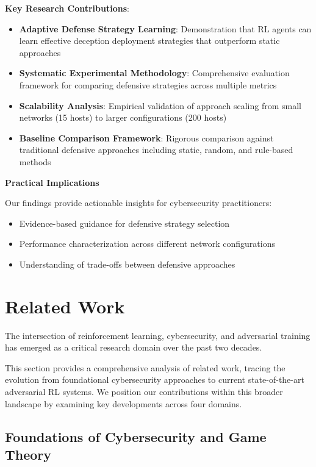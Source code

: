 \documentclass[12pt,twoside]{article}
\theoremstyle{definition}
\theoremstyle{plain}
\begin{document}
\textbf{Key Research Contributions}:
\begin{itemize}
    \item \textbf{Adaptive Defense Strategy Learning}: Demonstration that RL agents can learn effective deception deployment strategies that outperform static approaches
    \item \textbf{Systematic Experimental Methodology}: Comprehensive evaluation framework for comparing defensive strategies across multiple metrics
    \item \textbf{Scalability Analysis}: Empirical validation of approach scaling from small networks (15 hosts) to larger configurations (200 hosts)
    \item \textbf{Baseline Comparison Framework}: Rigorous comparison against traditional defensive approaches including static, random, and rule-based methods
\end{itemize}

\textbf{Practical Implications}

Our findings provide actionable insights for cybersecurity practitioners:
\begin{itemize}
    \item Evidence-based guidance for defensive strategy selection
    \item Performance characterization across different network configurations
    \item Understanding of trade-offs between defensive approaches
\end{itemize}

\section{Related Work}

The intersection of reinforcement learning, cybersecurity, and adversarial training has emerged as a critical research domain over the past two decades. 

This section provides a comprehensive analysis of related work, tracing the evolution from foundational cybersecurity approaches to current state-of-the-art adversarial RL systems. We position our contributions within this broader landscape by examining key developments across four domains.

\subsection{Foundations of Cybersecurity and Game Theory}
\end{document}
